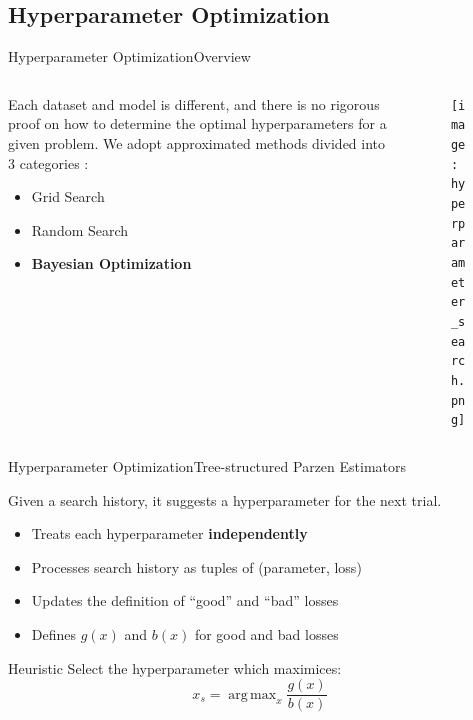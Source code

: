 \documentclass{beamer}
\DeclareMathOperator*{\argmax}{arg\,max}
\begin{document}
        \subsection{Hyperparameter Optimization}

            \begin{frame}{Hyperparameter Optimization}{Overview}
                \begin{columns}
                    \begin{column}{0.5\textwidth}
                        Each dataset and model is different, and there is no rigorous proof on how to determine the optimal hyperparameters for a given problem. We adopt approximated methods divided into 3 categories \cite{aws-hyperparameter}:
                        \begin{itemize}
                            \item Grid Search
                            \item Random Search
                            \item \textbf{Bayesian Optimization}
                        \end{itemize}
                    \end{column}
                    \begin{column}{0.5\textwidth}
                        \begin{figure}[!htbp]
                            \centering
                            \texttt{[image: hyperparameter\_search.png]}
                        \end{figure}
                    \end{column}
                \end{columns}
            \end{frame}

            \begin{frame}{Hyperparameter Optimization}{Tree-structured Parzen Estimators}

                Given a search history, it suggests a hyperparameter for the next trial.
                \begin{itemize}
                    \item Treats each hyperparameter \textbf{independently}
                    \item Processes search history as tuples of (parameter, loss)
                    \item Updates the definition of \enquote{good} and \enquote{bad} losses
                    \item Defines $g(x)$ and $b(x)$ for good and bad losses
                \end{itemize}

                \begin{exampleblock}{Heuristic}
                    Select the hyperparameter which maximices:
                    \begin{equation}
                        x_s = \argmax_{x} \frac{g(x)}{b(x)}
                    \end{equation}
                \end{exampleblock}
            \end{frame}
\end{document}
